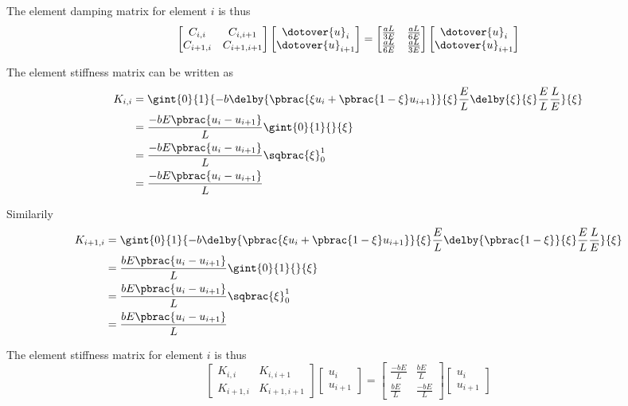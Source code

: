 The element damping matrix for element $i$ is thus
\begin{equation}
  \begin{bmatrix}
    C_{i,i} & C_{i,i+1} \\
    C_{i+1,i} & C_{i+1,i+1}
  \end{bmatrix}\begin{bmatrix}
    \dotover{u}_{i} \\
    \dotover{u}_{i+1}
  \end{bmatrix} = \begin{bmatrix}
    \frac{aL}{3E} & \frac{aL}{6E} \\
    \frac{aL}{6E} & \frac{aL}{3E}
   \end{bmatrix}\begin{bmatrix}
    \dotover{u}_{i} \\
    \dotover{u}_{i+1}
  \end{bmatrix}
\end{equation}

The element stiffness matrix can be written as
\begin{align}
  K_{i,i}&=\gint{0}{1}{-b\delby{\pbrac{\xi u_{i}+\pbrac{1-\xi}u_{i+1}}}{\xi}\dfrac{E}{L}\delby{\xi}{\xi}\dfrac{E}{L}\dfrac{L}{E}}{\xi} \\
  &=\dfrac{-bE\pbrac{u_{i}-u_{i+1}}}{L}\gint{0}{1}{}{\xi}\\
  &=\dfrac{-bE\pbrac{u_{i}-u_{i+1}}}{L}\sqbrac{\xi}_{0}^{1}\\
  &=\dfrac{-bE\pbrac{u_{i}-u_{i+1}}}{L}
\end{align}

Similarily
\begin{align}
  K_{i+1,i}&=\gint{0}{1}{-b\delby{\pbrac{\xi u_{i}+\pbrac{1-\xi}u_{i+1}}}{\xi}\dfrac{E}{L}\delby{\pbrac{1-\xi}}{\xi}\dfrac{E}{L}\dfrac{L}{E}}{\xi} \\
  &=\dfrac{bE\pbrac{u_{i}-u_{i+1}}}{L}\gint{0}{1}{}{\xi}\\
  &=\dfrac{bE\pbrac{u_{i}-u_{i+1}}}{L}\sqbrac{\xi}_{0}^{1}\\
  &=\dfrac{bE\pbrac{u_{i}-u_{i+1}}}{L}
\end{align}

The element stiffness matrix for element $i$ is thus
\begin{equation}
  \begin{bmatrix}
    K_{i,i} & K_{i,i+1} \\
    K_{i+1,i} & K_{i+1,i+1}
  \end{bmatrix}\begin{bmatrix}
    u_{i} \\
    u_{i+1}
  \end{bmatrix} = \begin{bmatrix}
    \frac{-bE}{L} & \frac{bE}{L} \\
    \frac{bE}{L} & \frac{-bE}{L}
   \end{bmatrix}\begin{bmatrix}
    u_{i} \\
    u_{i+1}
  \end{bmatrix}
\end{equation}


